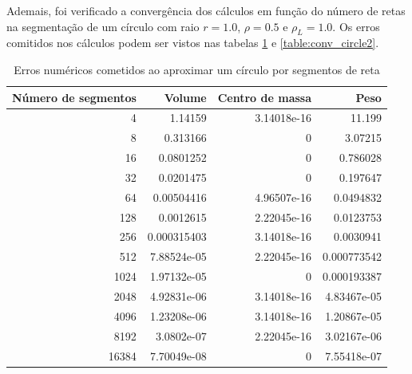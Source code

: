 \documentclass[
	12pt,				%
	oneside,			%
	a4paper,			%
	]{article}
\begin{document}
    Ademais, foi verificado a convergência dos cálculos em função do número de retas na segmentação de um círculo com raio $r= 1.0$, $\rho = 0.5$ e $\rho_L=1.0$. Os erros comitidos nos cálculos podem ser vistos nas tabelas \ref{table:conv_circle1} e \ref{table:conv_circle2}.
    \begin{table}[H]
        \centering
        \begin{tabular}{rrrr}
            \hline
            Número de segmentos &      Volume &   Centro de massa &        Peso \\
            \hline
                                4 &     1.14159 &       3.14018e-16 &      11.199 \\
                                8 &    0.313166 &                 0 &     3.07215 \\
                                16 &   0.0801252 &                 0 &    0.786028 \\
                                32 &   0.0201475 &                 0 &    0.197647 \\
                                64 &  0.00504416 &       4.96507e-16 &   0.0494832 \\
                            128 &   0.0012615 &       2.22045e-16 &   0.0123753 \\
                            256 & 0.000315403 &       3.14018e-16 &   0.0030941 \\
                            512 & 7.88524e-05 &       2.22045e-16 & 0.000773542 \\
                            1024 & 1.97132e-05 &                 0 & 0.000193387 \\
                            2048 & 4.92831e-06 &       3.14018e-16 & 4.83467e-05 \\
                            4096 & 1.23208e-06 &       3.14018e-16 & 1.20867e-05 \\
                            8192 &  3.0802e-07 &       2.22045e-16 & 3.02167e-06 \\
                            16384 & 7.70049e-08 &                 0 & 7.55418e-07 \\
            \hline
        \end{tabular}
        \caption{Erros numéricos cometidos ao aproximar um círculo por segmentos de reta}
        \label{table:conv_circle1}
    \end{table} 
\end{document}
